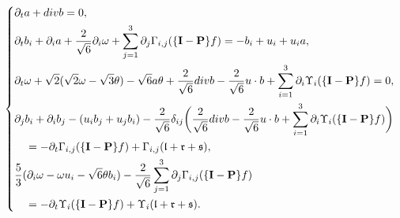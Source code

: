 \documentclass[10pt,a4paper]{amsart}
\begin{document}
\begin{equation}\label{G3.21}
\left\{\begin{aligned}
&\partial_t a+{\rm div} b=0,\\
& \partial_t b_i+\partial_i a+\frac{2}{\sqrt{6}} \partial_i \omega+\sum_{j=1}^3 \partial_{j} \Gamma_{i, j}(\{\mathbf{I}-\mathbf{P}\} f)=-b_i+u_i+u_i a, \\
& \partial_t \omega+\sqrt{2}(\sqrt{2} \omega-\sqrt{3} \theta)-\sqrt{6} a \theta+\frac{2}{\sqrt{6}} {\rm div}  b-\frac{2}{\sqrt{6}} u \cdot b    +\sum_{i=1}^3 \partial_{i} \Upsilon_i(\{\mathbf{I}-\mathbf{P}\} f)=0, \\
& \partial_j b_i+\partial_i b_j- (u_i b_j+u_j b_i )  -\frac{2}{\sqrt{6}} \delta_{i j}\bigg(\frac{2}{\sqrt{6}} {\rm div}   b-\frac{2}{\sqrt{6}} u \cdot b+\sum_{i=1}^3 \partial_{ i} \Upsilon_i(\{\mathbf{I}-\mathbf{P}\} f)\bigg) \\
&\quad =-\partial_t \Gamma_{i, j}(\{\mathbf{I}-\mathbf{P}\} f)+\Gamma_{i, j}(\mathfrak{l}+\mathfrak{r}+\mathfrak{s}), \\
& \frac{5}{3} (\partial_i \omega-\omega u_i-\sqrt{6} \theta b_i )-\frac{2}{\sqrt{6}} \sum_{j=1}^3 \partial_{j} \Gamma_{i, j}(\{\mathbf{I}-\mathbf{P}\} f)   \\
&\quad=-\partial_t \Upsilon_i(\{\mathbf{I}-\mathbf{P}\} f)+\Upsilon_i(\mathfrak{l}+\mathfrak{r}+\mathfrak{s}).
\end{aligned}\right.
\end{equation}
\end{document}
